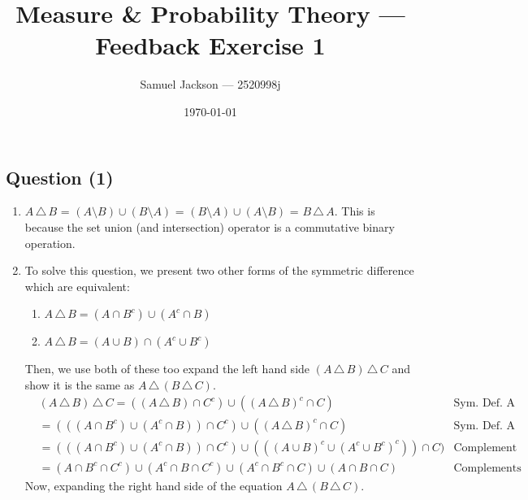 \documentclass{article}
\title{Measure \& Probability Theory  --- Feedback Exercise 1}
\author{Samuel Jackson --- 2520998j}
\date{\today}
\begin{document}
\maketitle

\newcommand{\symdiff}[2]{(#1 \setminus #2) \cup (#2 \setminus #1)}
\newcommand{\symdiffA}[2]{(#1 \cap #2^c) \cup (#1^c \cap #2)}
\newcommand{\symdiffB}[2]{(#1 \cup #2) \cap (#1^c \cup #2^c)}
\newcommand{\trigdiff}[2]{#1 \, \triangle \, #2}

\begin{center}
\section*{Question (1)}
\end{center}

\begin{enumerate}[label=(\roman*)]
    \item $\trigdiff{A}{B}$ = $\symdiff{A}{B}$ = $\symdiff{B}{A}$ = $B \, \triangle \, A$. This is because the set union (and intersection) operator is a commutative binary operation.
    \item To solve this question, we present two other forms of the symmetric difference which are equivalent:
        \begin{enumerate}[label=(\alph*)]
            \item $\trigdiff{A}{B} = \symdiffA{A}{B}$
            \item $\trigdiff{A}{B} = \symdiffB{A}{B}$
        \end{enumerate}
        Then, we use both of these too expand the left hand side $(\trigdiff{A}{B}) \, \triangle \, C$ and show it is the same as $A \, \triangle \, (\trigdiff{B}{C})$.
        \begin{align*}
            & (\trigdiff{A}{B}) \, \triangle \, C = ((\trigdiff{A}{B}) \cap C^c) \cup ((\trigdiff{A}{B})^c \cap C) & \text{Sym. Def. A} \\ 
            & = (((A \cap B^c) \cup (A^c \cap B)) \cap C^c) \cup ((\trigdiff{A}{B})^c \cap C) & \text{Sym. Def. A} \\ 
            & = (((A \cap B^c) \cup (A^c \cap B)) \cap C^c) \cup (((A \cup B)^c \cup (A^c \cup B^c)^c)) \cap C) & \text{Complement of Sym. Def. B} \\ 
            & = (A \cap B^c \cap C^c) \cup (A^c \cap B \cap C^c) \cup (A^c \cap B^c \cap C) \cup (A \cap B \cap C) & \text{Complements and Intersection Distri.}
        \end{align*}
        Now, expanding the right hand side of the equation $A \, \triangle \, (\trigdiff{B}{C})$.

\end{enumerate}
\end{document}
